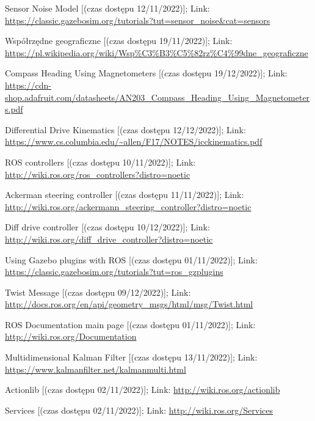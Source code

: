 \begin{thebibliography}{9}
    Sensor Noise Model [(czas dostępu  12/11/2022)]; Link: 
    \url{https://classic.gazebosim.org/tutorials?tut=sensor_noise&cat=sensors}
    
    Współrzędne geograficzne [(czas dostępu  19/11/2022)]; Link: 
    \url{https://pl.wikipedia.org/wiki/Wsp%C3%B3%C5%82rz%C4%99dne_geograficzne}
    
    Compass Heading Using Magnetometers [(czas dostępu  19/12/2022)]; Link: 
    \url{https://cdn-shop.adafruit.com/datasheets/AN203_Compass_Heading_Using_Magnetometers.pdf}
    
    Differential Drive Kinematics [(czas dostępu  12/12/2022)]; Link: 
    \url{https://www.cs.columbia.edu/~allen/F17/NOTES/icckinematics.pdf}
    
    ROS controllers [(czas dostępu  10/11/2022)]; Link: 
    \url{http://wiki.ros.org/ros_controllers?distro=noetic}
    
    Ackerman steering controller [(czas dostępu  11/11/2022)]; Link: 
    \url{http://wiki.ros.org/ackermann_steering_controller?distro=noetic}
    
    Diff drive controller [(czas dostępu  10/12/2022)]; Link: 
    \url{http://wiki.ros.org/diff_drive_controller?distro=noetic}
    
    Using Gazebo plugins with ROS [(czas dostępu  01/11/2022)]; Link: 
    \url{https://classic.gazebosim.org/tutorials?tut=ros_gzplugins}
    
    Twist Message [(czas dostępu  09/12/2022)]; Link: 
    \url{http://docs.ros.org/en/api/geometry_msgs/html/msg/Twist.html}
    
    ROS Documentation main page [(czas dostępu  01/11/2022)]; Link: 
    \url{http://wiki.ros.org/Documentation}

    Multidimensional Kalman Filter [(czas dostępu  13/11/2022)]; Link: 
    \url{https://www.kalmanfilter.net/kalmanmulti.html}
    
    Actionlib [(czas dostępu  02/11/2022)]; Link: 
    \url{http://wiki.ros.org/actionlib}
    
    Services [(czas dostępu  02/11/2022)]; Link: 
    \url{http://wiki.ros.org/Services}
    

\end{thebibliography}
